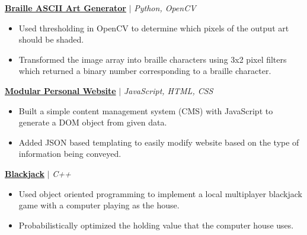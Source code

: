 \documentclass{article}
\newcommand{\smallbullet}{\,\begin{picture}(-1,1)(-1,-3)\circle*{3}\end{picture}\ }
\newenvironment{resumeItem}
{
    \vspace{0.5em}
}
{
}
\newcommand{\projectHead}[3]{
    \textbf{#1} $\vert$ \textit{#2} \\[-1.2em]
}
\newenvironment{resumeList}
{
    \begin{itemize}[label=\smallbullet]
}
{
    \end{itemize}
}
\begin{document}

\begin{resumeItem}
\projectHead{\href{https://github.com/arnavcs/ASCII-art}{Braille ASCII Art Generator}}{Python, OpenCV}{Apr 2021 - Jul 2021}
\begin{resumeList}
    \item Used thresholding in OpenCV to determine which pixels of the output art should be shaded.
    \item Transformed the image array into braille characters using 3x2 pixel filters which returned a binary number corresponding to a braille character.
\end{resumeList}
\end{resumeItem}

\begin{resumeItem}
\projectHead{\href{https://github.com/arnavcs/arnavcs.github.io}{Modular Personal Website}}{JavaScript, HTML, CSS}{Mar 2022 - Aug 2022}
\begin{resumeList}
    \item Built a simple content management system (CMS) with JavaScript to generate a DOM object from given data.
    \item Added JSON based templating to easily modify website based on the type of information being conveyed.
\end{resumeList}
\end{resumeItem}

\begin{resumeItem}
\projectHead{\href{https://github.com/arnavcs/black-jack}{Blackjack}}{C++}{Apr 2021 - Jul 2021}
\begin{resumeList}
    \item Used object oriented programming to implement a local multiplayer blackjack game with a computer playing as the house.
    \item Probabilistically optimized the holding value that the computer house uses.
\end{resumeList}
\end{resumeItem}
\end{document}

